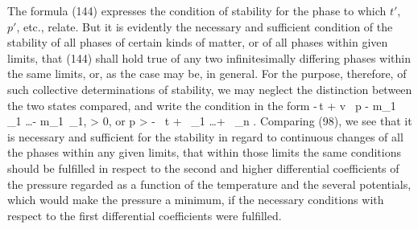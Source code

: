 \documentclass[12pt]{memoir}
\begin{document}
The formula (144) expresses the condition of stability for the phase to which $t'$, $p'$, etc., relate.  But it is evidently the necessary and sufficient condition of the stability of all phases of certain kinds of matter, or of all phases within given limits, that (144) shall hold true of any two infinitesimally differing phases within the same limits, or, as the case may be, in general.  For the purpose, therefore, of such collective determinations of stability, we may neglect the distinction between the two states compared, and write the condition in the form
\eqs  -\eta \,\Delta t + v \, \Delta p - m_1 \, \Delta \mu_1 \dots - m_1 \,\Delta \mu_1, > 0, \label{148}\eqe
or
\eqs
\Delta p > - \, \Delta t +  \, \Delta \mu_1  \dots +  \, \Delta \mu_n .\label{149}
\eqe
Comparing (98), we see that it is necessary and sufficient for the stability in regard to continuous changes of all the phases within any given limits, that within those limits the same conditions should be fulfilled in respect to the second and higher differential coefficients of the pressure regarded as a function of the temperature and the several potentials, which would make the pressure a minimum, if the necessary conditions with respect to the first differential coefficients were fulfilled.
\end{document}
